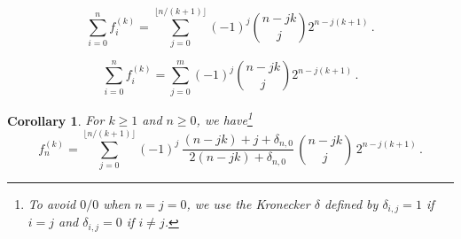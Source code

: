 \documentclass[10pt,a4paper]{amsart}
\newtheorem{corollary}{Corollary}
\begin{document}
\begin{equation}\label{main.comb}
\sum_{i=0}^{n} f_{i}^{(k)} = \sum_{j=0}^{\lfloor n/(k+1) \rfloor} (-1)^{j} \binom{n-jk}{j}2^{n-j(k+1)} 
\,.
\end{equation}

\begin{equation}
\label{eqn.comb2}
\sum_{i=0}^{n} f_i^{(k)}  %
=\sum_{j=0}^{m} (-1)^{j} \binom{n-jk}{j}2^{n-j(k+1)} 
\,.
\end{equation}

\begin{corollary}\label{main.cor}
For  $k\geq 1$ and $n \geq 0$, we have\footnote{To avoid  $0/0$  when
$n=j=0$, we use the 
Kronecker $\delta$ defined by $\delta_{i, j} = 1$
if $i=j$ and $\delta_{i, j} = 0$ if $i\neq j$.}
\begin{equation}\label{cor.eqn1}
f_{n}^{(k)}= 
\sum_{j=0}^{\lfloor n/(k+1)\rfloor} (-1)^j\,
\frac{(n-jk)+j+\delta_{n,0}}{2(n-jk)+\delta_{n,0}}\,  \binom{n-jk}{j} \,  2^{n-j(k+1)}
\,.
\end{equation}
\end{corollary}
\end{document}
